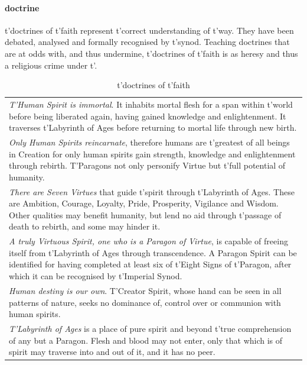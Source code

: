 \paragraph{doctrine} t'\allowbreak doctrines of t'\allowbreak faith represent t'\allowbreak correct understanding of t'\allowbreak way. They have been debated, analysed and formally recognised by t'\allowbreak synod. Teaching doctrines that are at odds with, and thus undermine, t'\allowbreak doctrines of t'\allowbreak faith is as heresy and thus a religious crime under t'\allowbreak {}.\begin{table} \begin{tabular}{p{}}\emph{T'Human Spirit is immortal}. It inhabits mortal flesh for a span within t'\allowbreak world before being liberated again, having gained knowledge and enlightenment. It traverses t'\allowbreak Labyrinth of Ages before returning to mortal life through new birth.\\ \emph{Only Human Spirits reincarnate}, therefore humans are t'\allowbreak greatest of all beings in Creation for only human spirits gain strength, knowledge and enlightenment through rebirth. T'Paragons not only personify Virtue but t'\allowbreak full potential of humanity.\\\emph{There are Seven Virtues} that guide t'\allowbreak spirit through t'\allowbreak Labyrinth of Ages. These are Ambition, Courage, Loyalty, Pride, Prosperity, Vigilance and Wisdom. Other qualities may benefit humanity, but lend no aid through t'\allowbreak passage of death to rebirth, and some may hinder it.\\\emph{A truly Virtuous Spirit, one who is a Paragon of Virtue}, is capable of freeing itself from t'\allowbreak Labyrinth of Ages through transcendence. A Paragon Spirit can be identified for having completed at least six of t'\allowbreak Eight Signs of t'\allowbreak Paragon, after which it can be recognised by t'\allowbreak Imperial Synod.\\\emph{Human destiny is our own}. T'Creator Spirit, whose hand can be seen in all patterns of nature, seeks no dominance of, control over or communion with human spirits.\\\emph{T'Labyrinth of Ages} is a place of pure spirit and beyond t'\allowbreak true comprehension of any but a Paragon. Flesh and blood may not enter, only that which is of spirit may traverse into and out of it, and it has no peer.\end{tabular}\caption{t'doctrines of t'\allowbreak faith}\end{table}

